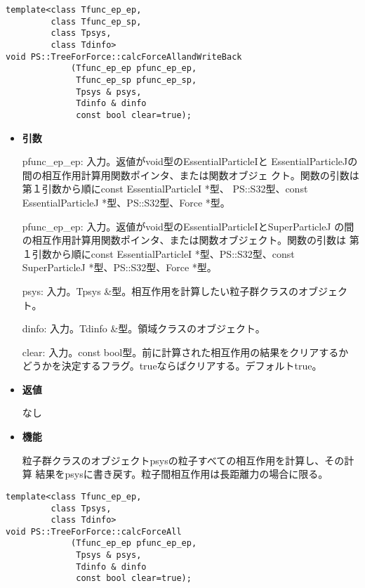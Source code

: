 \begin{screen}
\begin{verbatim}
template<class Tfunc_ep_ep,
         class Tfunc_ep_sp,
         class Tpsys,
         class Tdinfo>
void PS::TreeForForce::calcForceAllandWriteBack
             (Tfunc_ep_ep pfunc_ep_ep,
              Tfunc_ep_sp pfunc_ep_sp,
              Tpsys & psys,
              Tdinfo & dinfo
              const bool clear=true);
\end{verbatim}
\end{screen}

\begin{itemize}

\item {\bf 引数}

pfunc\_ep\_ep: 入力。返値がvoid型のEssentialParticleIと
EssentialParticleJの間の相互作用計算用関数ポインタ、または関数オブジェ
クト。関数の引数は第１引数から順にconst EssentialParticleI *型、
PS::S32型、const EssentialParticleJ *型、PS::S32型、Force *型。

pfunc\_ep\_ep: 入力。返値がvoid型のEssentialParticleIとSuperParticleJ
の間の相互作用計算用関数ポインタ、または関数オブジェクト。関数の引数は
第１引数から順にconst EssentialParticleI *型、PS::S32型、const
SuperParticleJ *型、PS::S32型、Force *型。

psys: 入力。Tpsys \&型。相互作用を計算したい粒子群クラスのオブジェクト。

dinfo: 入力。Tdinfo \&型。領域クラスのオブジェクト。

clear: 入力。const bool型。前に計算された相互作用の結果をクリアするか
どうかを決定するフラグ。trueならばクリアする。デフォルトtrue。

\item {\bf 返値}

なし

\item {\bf 機能}

粒子群クラスのオブジェクトpsysの粒子すべての相互作用を計算し、その計算
結果をpsysに書き戻す。粒子間相互作用は長距離力の場合に限る。

\end{itemize}


\begin{screen}
\begin{verbatim}
template<class Tfunc_ep_ep,
         class Tpsys,
         class Tdinfo>
void PS::TreeForForce::calcForceAll
             (Tfunc_ep_ep pfunc_ep_ep,
              Tpsys & psys,
              Tdinfo & dinfo
              const bool clear=true);
\end{verbatim}
\end{screen}

